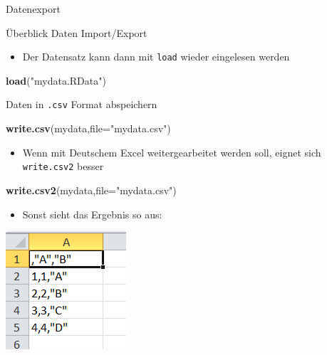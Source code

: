 \documentclass[ignorenonframetext,]{beamer}
\newenvironment{Shaded}{}{}
\newcommand{\KeywordTok}[1]{\textcolor[rgb]{0.00,0.44,0.13}{\textbf{{#1}}}}
\newcommand{\DataTypeTok}[1]{\textcolor[rgb]{0.56,0.13,0.00}{{#1}}}
\newcommand{\StringTok}[1]{\textcolor[rgb]{0.25,0.44,0.63}{{#1}}}
\newcommand{\NormalTok}[1]{{#1}}
\providecommand{\tightlist}{%
\setlength{\itemsep}{0pt}\setlength{\parskip}{0pt}}
\begin{document}
\begin{frame}[fragile]{Datenexport}
\begin{block}{Überblick Daten Import/Export}
\begin{itemize}
\tightlist
\item
  Der Datensatz kann dann mit \texttt{load} wieder eingelesen werden
\end{itemize}

\begin{Shaded}
\begin{Highlighting}[]
\KeywordTok{load}\NormalTok{(}\StringTok{"mydata.RData"}\NormalTok{)}
\end{Highlighting}
\end{Shaded}

\end{block}

\begin{block}{Daten in \texttt{.csv} Format abspeichern}

\begin{Shaded}
\begin{Highlighting}[]
\KeywordTok{write.csv}\NormalTok{(mydata,}\DataTypeTok{file=}\StringTok{"mydata.csv"}\NormalTok{) }
\end{Highlighting}
\end{Shaded}

\begin{itemize}
\tightlist
\item
  Wenn mit Deutschem Excel weitergearbeitet werden soll, eignet sich
  \texttt{write.csv2} besser
\end{itemize}

\begin{Shaded}
\begin{Highlighting}[]
\KeywordTok{write.csv2}\NormalTok{(mydata,}\DataTypeTok{file=}\StringTok{"mydata.csv"}\NormalTok{) }
\end{Highlighting}
\end{Shaded}

\begin{itemize}
\tightlist
\item
  Sonst sieht das Ergebnis so aus:
\end{itemize}

\includegraphics{./tex2pdf.9796/18fa31a6671691665971d435cb85f1252e5f17a0.png}


\end{block}
\end{frame}
\end{document}
